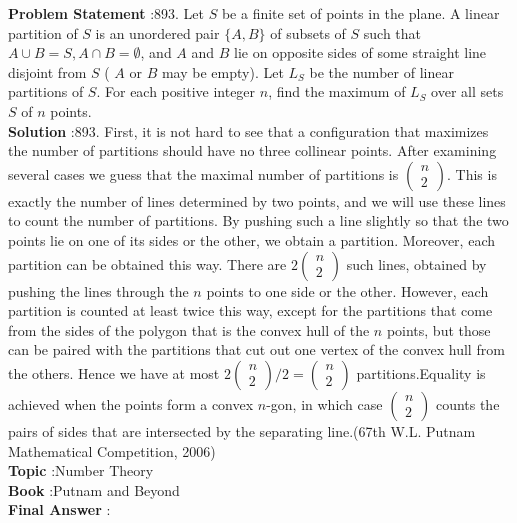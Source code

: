 \documentclass[10pt]{article}
\begin{document}
\textbf{Problem Statement} :893. Let $S$ be a finite set of points in the plane. A linear partition of $S$ is an unordered pair $\{A, B\}$ of subsets of $S$ such that $A \cup B=S, A \cap B=\emptyset$, and $A$ and $B$ lie on opposite sides of some straight line disjoint from $S$ ( $A$ or $B$ may be empty). Let $L_{S}$ be the number of linear partitions of $S$. For each positive integer $n$, find the maximum of $L_{S}$ over all sets $S$ of $n$ points.\\
\textbf{Solution} :893. First, it is not hard to see that a configuration that maximizes the number of partitions should have no three collinear points. After examining several cases we guess that the maximal number of partitions is $\left(\begin{array}{l}n \\ 2\end{array}\right)$. This is exactly the number of lines determined by two points, and we will use these lines to count the number of partitions. By pushing such a line slightly so that the two points lie on one of its sides or the other, we obtain a partition. Moreover, each partition can be obtained this way. There are $2\left(\begin{array}{l}n \\ 2\end{array}\right)$ such lines, obtained by pushing the lines through the $n$ points to one side or the other. However, each partition is counted at least twice this way, except for the partitions that come from the sides of the polygon that is the convex hull of the $n$ points, but those can be paired with the partitions that cut out one vertex of the convex hull from the others. Hence we have at most $2\left(\begin{array}{l}n \\ 2\end{array}\right) / 2=\left(\begin{array}{l}n \\ 2\end{array}\right)$ partitions.Equality is achieved when the points form a convex $n$-gon, in which case $\left(\begin{array}{l}n \\ 2\end{array}\right)$ counts the pairs of sides that are intersected by the separating line.(67th W.L. Putnam Mathematical Competition, 2006)\\
\textbf{Topic} :Number Theory\\
\textbf{Book} :Putnam and Beyond\\
\textbf{Final Answer} :\\
\end{document}
